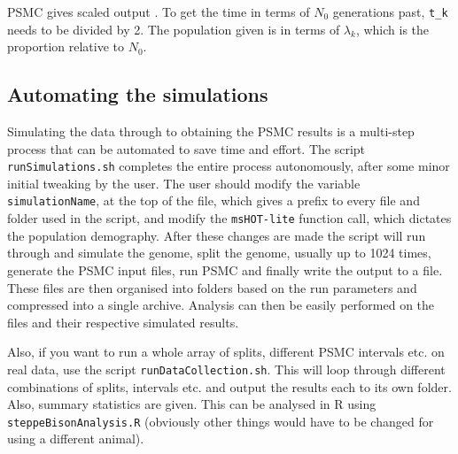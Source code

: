 \documentclass[11pt,a4paper]{article}
\begin{document}
PSMC gives scaled output \cite{li2011inference}. To get the time in terms of $N_0$ generations past, \verb|t_k| needs to be divided by 2. The population given is in terms of $\lambda_k$, which is the proportion relative to $N_0$.

\subsection{Automating the simulations}

Simulating the data through to obtaining the PSMC results is a multi-step process that can be automated to save time and effort. The script \verb|runSimulations.sh| completes the entire process autonomously, after some minor initial tweaking by the user. The user should modify the variable \verb|simulationName|, at the top of the file, which gives a prefix to every file and folder used in the script, and modify the \verb|msHOT-lite| function call, which dictates the population demography. After these changes are made the script will run through and simulate the genome, split the genome, usually up to 1024 times, generate the PSMC input files, run PSMC and finally write the output to a file. These files are then organised into folders based on the run parameters and compressed into a single archive. Analysis can then be easily performed on the files and their respective simulated results.

Also, if you want to run a whole array of splits, different PSMC intervals etc. on real data, use the script \verb|runDataCollection.sh|. This will loop through different combinations of splits, intervals etc. and output the results each to its own folder. Also, summary statistics are given. This can be analysed in R using \verb|steppeBisonAnalysis.R| (obviously other things would have to be changed for using a different animal).
\end{document}
